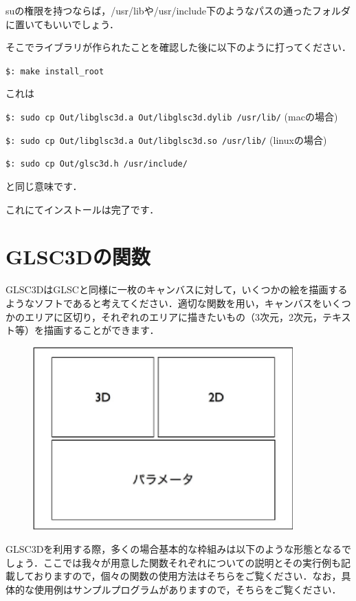 \documentclass[a4paper,12pt]{jsarticle}%
\begin{document}
suの権限を持つならば，/usr/libや/usr/include下のようなパスの通ったフォルダに置いてもいいでしょう．

そこでライブラリが作られたことを確認した後に以下のように打ってください．

\verb|$: make install_root |

これは

\verb|$: sudo cp Out/libglsc3d.a Out/libglsc3d.dylib /usr/lib/| (macの場合)

\verb|$: sudo cp Out/libglsc3d.a Out/libglsc3d.so /usr/lib/| (linuxの場合)

\verb|$: sudo cp Out/glsc3d.h /usr/include/|

と同じ意味です．

これにてインストールは完了です．

\newpage
\section{GLSC3Dの関数}

GLSC3DはGLSCと同様に一枚のキャンバスに対して，いくつかの絵を描画するようなソフトであると考えてください．適切な関数を用い，キャンバスをいくつかのエリアに区切り，それぞれのエリアに描きたいもの（3次元，2次元，テキスト等）を描画することができます．
\begin{figure}[htb]
	\includegraphics[width=100mm]{./Figures/eps/Canvas_kansu_gaiyo.eps}
\end{figure}

GLSC3Dを利用する際，多くの場合基本的な枠組みは以下のような形態となるでしょう．ここでは我々が用意した関数それぞれについての説明とその実行例も記載しておりますので，個々の関数の使用方法はそちらをご覧ください．なお，具体的な使用例はサンプルプログラムがありますので，そちらをご覧ください．\\
\end{document}
